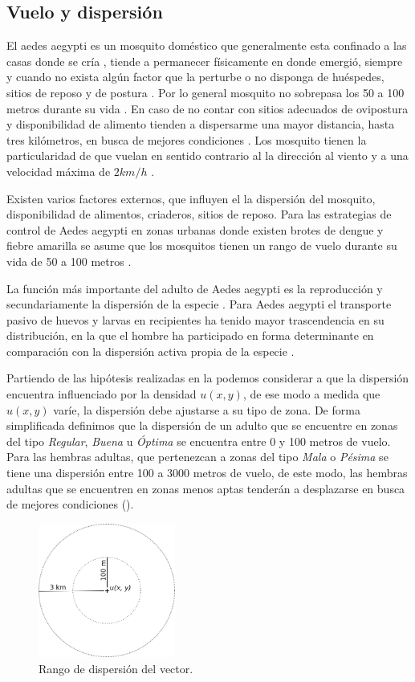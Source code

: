 
\subsection{Vuelo y dispersión}
\label{subsec:cap4-vuelo-dispersion}
El aedes aegypti es un mosquito doméstico que generalmente esta confinado a las casas donde se
cría \cite{luevano1993ciclo}, tiende a permanecer físicamente en donde emergió, siempre y cuando
no exista algún factor que la perturbe o no disponga de huéspedes, sitios de reposo y de postura
\cite{ThironIzcazaJ2003}. Por lo general mosquito no sobrepasa los 50 a 100 metros durante su vida
\cite{cabezas2005dengue}. En caso de no contar con sitios adecuados de ovipostura y disponibilidad
de alimento tienden a dispersarme una mayor distancia, hasta tres kilómetros, en busca de
mejores condiciones \cite{ThironIzcazaJ2003}. Los mosquito tienen la particularidad de que vuelan
en sentido contrario al la dirección al viento \cite{ThironIzcazaJ2003,web-site:speedAnimals} y a
una velocidad máxima de $2 km/h$ \cite{web-site:speedAnimals,kaufmann2004flight}.

Existen varios factores externos, que influyen el la dispersión del mosquito, disponibilidad de
alimentos, criaderos, sitios de reposo. Para las estrategias de control de Aedes aegypti en zonas
urbanas donde existen brotes de dengue y fiebre amarilla se asume que los mosquitos tienen un
rango de vuelo durante su vida de 50 a 100 metros \cite{dengueUruguayCap8}.

La función más importante del adulto de Aedes aegypti es la reproducción y secundariamente la
dispersión de la especie \cite{ThironIzcazaJ2003}. Para Aedes aegypti el transporte pasivo de
huevos y larvas en recipientes ha tenido mayor trascendencia en su distribución, en la que el
hombre ha participado en forma determinante en comparación con la dispersión activa propia de la
especie \citep{ThironIzcazaJ2003}.

Partiendo de las hipótesis realizadas en la  podemos considerar a
que la dispersión encuentra influenciado por la densidad $u(x,y)$, de ese modo a medida que
$u(x,y)$ varíe, la dispersión debe ajustarse a su tipo de zona. De forma simplificada definimos que
la dispersión de un adulto que se encuentre en zonas del tipo \textit{Regular}, \textit{Buena} u
\textit{Óptima} se encuentra entre 0 y 100 metros de vuelo. Para las hembras adultas, que
pertenezcan a zonas del tipo \textit{Mala} o \textit{Pésima} se tiene una dispersión entre 100 a
3000 metros de vuelo, de este modo, las hembras adultas que se encuentren en zonas menos aptas
tenderán a desplazarse en busca de mejores condiciones ().

\begin{figure}
\centering
\includegraphics[width=0.4\textwidth]{capitulo-4/graphics/rango-vuelo.png}
\caption{\label{fig:cap4-dispersion} Rango de dispersión del vector.}
\end{figure}
